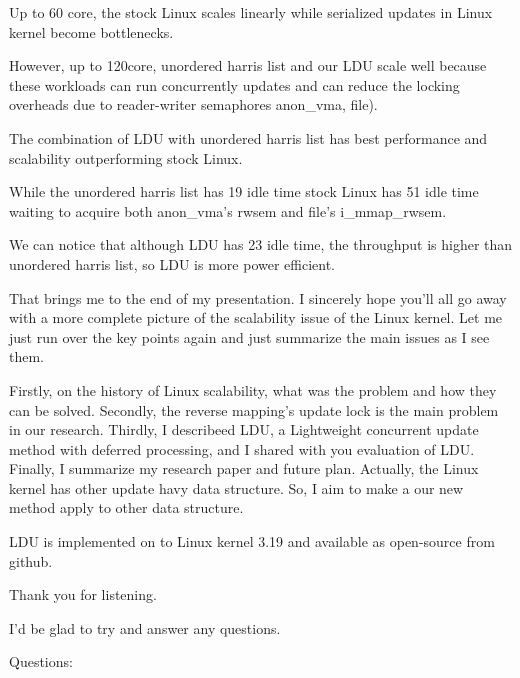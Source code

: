 Up to 60 core, the stock Linux scales linearly while serialized updates in
Linux kernel become bottlenecks.
 
However, up to 120core, unordered harris list and our LDU scale well because
these workloads can run concurrently updates and can reduce the locking
overheads due to reader-writer semaphores anon_vma, file).

The combination of LDU with unordered harris list has best performance and
scalability outperforming stock Linux.

While the unordered harris list has 19 idle time stock Linux has 51 idle time
 waiting to acquire both anon_vma's rwsem and file's i_mmap_rwsem.

We can notice that although LDU has 23 idle time, the throughput is higher
than unordered harris list, so LDU is more power efficient.


That brings me to the end of my presentation. 
I sincerely hope you'll all go away with a more complete picture of the
scalability issue of the Linux kernel.
Let me just run over the key points again and just summarize the main issues as
I see them.

Firstly, on the history of Linux scalability, what was the problem and how
they can be solved.
Secondly, the reverse mapping's update lock is the main problem in our research.
Thirdly, I describeed LDU, a Lightweight concurrent update
method with deferred processing, and I shared with you evaluation of LDU.
Finally, I summarize my research paper and future plan. 
Actually, the Linux kernel has other update havy data structure.
So, I aim to make a our new method apply to other data structure.

LDU is implemented on to Linux kernel 3.19 and available as open-source from
github.

Thank you for listening.

I'd be glad to try and answer any questions. 

Questions:
